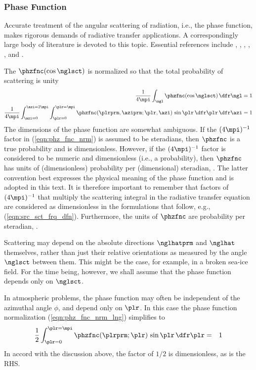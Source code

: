 \documentclass[12pt]{article}
\begin{document}
\subsubsection[Phase Function]{Phase Function}\label{sxn:phz_fnc}
Accurate treatment of the angular scattering of radiation, i.e., the
phase function, makes rigorous demands of radiative
transfer applications.
A correspondingly large body of literature is devoted to this topic.
Essential references include \citet{Van57}, \citet{JWW76},
\citet{WiG76}, \citet{Wis771}, \citet{Wis79}, and \citet{Bou98}.

The  $\phzfnc(\cos \nglsct)$ is normalized so
that the total probability of scattering is unity
\begin{subequations}
\label{eqn:phz_fnc_nrm}
\begin{align}
\label{eqn:phz_fnc_nrm_sht}
\frac{1}{4\mpi} \int_{\ngl} \phzfnc(\cos \nglsct) \,\dfr\ngl & = 1 \\
\label{eqn:phz_fnc_nrm_lng}
\frac{1}{4\mpi} \int_{\azi = 0}^{\azi = 2\mpi} 
\int_{\plr = 0}^{\plr = \mpi} 
\phzfnc(\plrprm,\aziprm;\plr,\azi) \, \sin \plr \,\dfr\plr
 \,\dfr\azi
& = 1
\end{align}
\end{subequations}
The dimensions of the phase function are somewhat ambiguous.
If the $(4\mpi)^{-1}$ factor in (\ref{eqn:phz_fnc_nrm}) is assumed
to be steradians, then $\phzfnc$ is a true probability and is
dimensionless. 
However, if the $(4\mpi)^{-1}$ factor is considered to be numeric
and dimensionless (i.e., a probability), then $\phzfnc$ has units
of (dimensionless) probability per (dimensional) steradian, \xsr.
The latter convention best expresses the physical meaning of the
phase function and is adopted in this text.
It is therefore important to remember that factors of $(4\mpi)^{-1}$ 
that multiply the scattering integral in the radiative transfer
equation are considered as dimensionless in the formulations
that follow, e.g., (\ref{eqn:src_sct_frq_dfn}).
Furthermore, the units of $\phzfnc$ are probability per steradian,
\xsr.  

Scattering may depend on the absolute directions $\nglhatprm$ and
$\nglhat$ themselves, rather than just their relative orientations as
measured by the angle $\nglsct$ between them.  
This might be the case, for example, in a broken sea-ice field.
For the time being, however, we shall assume that the phase function
depends only on $\nglsct$.

In atmospheric problems, the phase function may often be independent
of the azimuthal angle $\phi$, and depend only on $\plr$.
In this case the phase function normalization
(\ref{eqn:phz_fnc_nrm_lng}) simplifies to 
\begin{eqnarray}
\label{eqn:phz_fnc_nrm_plr}
\frac{1}{2}
\int_{\plr = 0}^{\plr = \mpi} 
\phzfnc(\plrprm;\plr) \, \sin \plr \,\dfr\plr
& = & 1
\end{eqnarray}
In accord with the discussion above, the factor of $1/2$ is
dimensionless, as is the RHS. 
\end{document}
